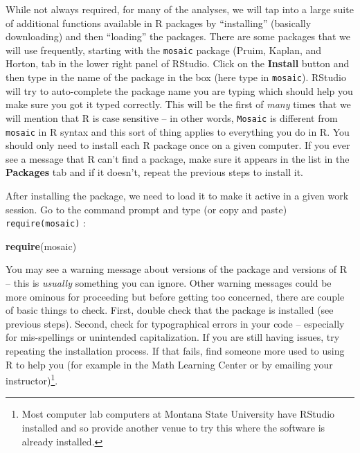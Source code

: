 \documentclass[]{book}
\newenvironment{Shaded}{\begin{snugshade}}{\end{snugshade}}
\newcommand{\KeywordTok}[1]{\textcolor[rgb]{0.13,0.29,0.53}{\textbf{{#1}}}}
\newcommand{\NormalTok}[1]{{#1}}
\let\rmarkdownfootnote\footnote%
\def\footnote{\protect\rmarkdownfootnote}
\begin{document}
While not always required, for many of the analyses, we will tap into a
large suite of additional functions available in R packages by
``installing'' (basically downloading) and then ``loading'' the
packages. There are some packages that we will use frequently, starting
with the \texttt{mosaic} package (Pruim, Kaplan, and Horton, tab in the
lower right panel of RStudio. Click on the \textbf{Install} button and
then type in the name of the package in the box (here type in
\texttt{mosaic}). RStudio will try to auto-complete the package name you
are typing which should help you make sure you got it typed correctly.
This will be the first of \emph{many} times that we will mention that R
is case sensitive -- in other words, \texttt{Mosaic} is different from
\texttt{mosaic} in R syntax and this sort of thing applies to everything
you do in R. You should only need to install each R package once on a
given computer. If you ever see a message that R can't find a package,
make sure it appears in the list in the \textbf{Packages} tab and if it
doesn't, repeat the previous steps to install it.

After installing the package, we need to load it to make it active in a
given work session. Go to the command prompt and type (or copy and
paste) \texttt{require(mosaic)} :

\begin{Shaded}
\begin{Highlighting}[]
\KeywordTok{require}\NormalTok{(mosaic)}
\end{Highlighting}
\end{Shaded}

You may see a warning message about versions of the package and versions
of R -- this is \emph{usually} something you can ignore. Other warning
messages could be more ominous for proceeding but before getting too
concerned, there are couple of basic things to check. First, double
check that the package is installed (see previous steps). Second, check
for typographical errors in your code -- especially for mis-spellings or
unintended capitalization. If you are still having issues, try repeating
the installation process. If that fails, find someone more used to using
R to help you (for example in the Math Learning Center or by emailing
your instructor)\footnote{Most computer lab computers at Montana State
  University have RStudio installed and so provide another venue to try
  this where the software is already installed.}.
\end{document}
